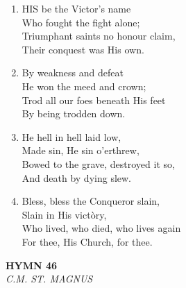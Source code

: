 \begin{enumerate}
    \item HIS be the Victor's name \\
        Who fought the fight alone; \\
        Triumphant saints no honour claim, \\
        Their conquest was His own.

    \item By weakness and defeat \\
        He won the meed and crown; \\
        Trod all our foes beneath His feet \\
        By being trodden down.

    \item He hell in hell laid low, \\
        Made sin, He sin o'erthrew, \\
        Bowed to the grave, destroyed it so, \\
        And death by dying slew.

    \item Bless, bless the Conqueror slain, \\
        Slain in His vict\`ory, \\
        Who lived, who died, who lives again \\
        For thee, His Church, for thee.

\end{enumerate}

\newpage
\begin{center}
    {\Large \textbf{HYMN 46}}
    \\
    \textit{C.M. ST. MAGNUS}
\end{center}
\vspace{1em}

